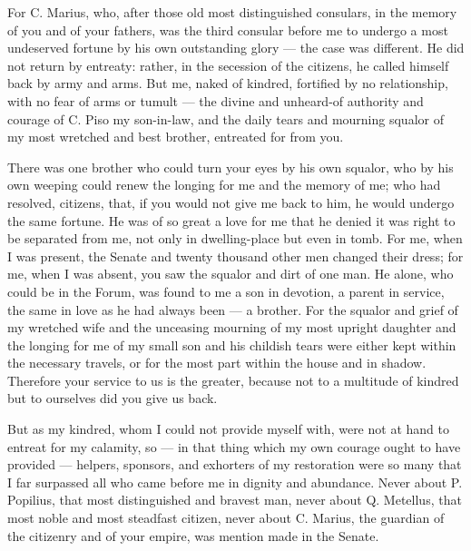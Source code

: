 For C. Marius, who, after those old most distinguished consulars, in the memory of you and of your fathers, was the third consular before me to undergo a most undeserved fortune by his own outstanding glory --- the case was different. He did not return by entreaty: rather, in the secession of the citizens, he called himself back by army and arms. But me, naked of kindred, fortified by no relationship, with no fear of arms or tumult --- the divine and unheard-of authority and courage of C. Piso my son-in-law, and the daily tears and mourning squalor of my most wretched and best brother, entreated for from you.

 There was one brother who could turn your eyes by his own squalor, who by his own weeping could renew the longing for me and the memory of me; who had resolved, citizens, that, if you would not give me back to him, he would undergo the same fortune. He was of so great a love for me that he denied it was right to be separated from me, not only in dwelling-place but even in tomb. For me, when I was present, the Senate and twenty thousand other men changed their dress; for me, when I was absent, you saw the squalor and dirt of one man. He alone, who could be in the Forum, was found to me a son in devotion, a parent in service, the same in love as he had always been --- a brother. For the squalor and grief of my wretched wife and the unceasing mourning of my most upright daughter and the longing for me of my small son and his childish tears were either kept within the necessary travels, or for the most part within the house and in shadow. Therefore your service to us is the greater, because not to a multitude of kindred but to ourselves did you give us back.

 But as my kindred, whom I could not provide myself with, were not at hand to entreat for my calamity, so --- in that thing which my own courage ought to have provided --- helpers, sponsors, and exhorters of my restoration were so many that I far surpassed all who came before me in dignity and abundance. Never about P. Popilius, that most distinguished and bravest man, never about Q. Metellus, that most noble and most steadfast citizen, never about C. Marius, the guardian of the citizenry and of your empire, was mention made in the Senate.

